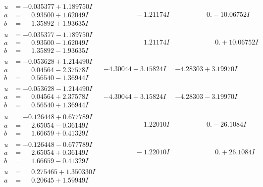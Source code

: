\documentclass[1p]{elsarticle_modified}
\theoremstyle{definition}
\begin{document}
$$\begin{array}{c|c|c}
\begin{aligned}
u &= -0.035377 + 1.189750 I \\
a &= \phantom{-}0.93500 + 1.62049 I \\
b &= \phantom{-}1.35892 + 1.93635 I\end{aligned}
 & \phantom{-0.000000 } -1.21174 I & \phantom{-0.000000 } 0. - 10.06752 I \\ \hline\begin{aligned}
u &= -0.035377 - 1.189750 I \\
a &= \phantom{-}0.93500 - 1.62049 I \\
b &= \phantom{-}1.35892 - 1.93635 I\end{aligned}
 & \phantom{-0.000000 -}1.21174 I & \phantom{-0.000000 -}0. + 10.06752 I \\ \hline\begin{aligned}
u &= -0.053628 + 1.214490 I \\
a &= \phantom{-}0.04564 - 2.37578 I \\
b &= \phantom{-}0.56540 - 1.36944 I\end{aligned}
 & -4.30044 - 3.15824 I & -4.28303 + 3.19970 I \\ \hline\begin{aligned}
u &= -0.053628 - 1.214490 I \\
a &= \phantom{-}0.04564 + 2.37578 I \\
b &= \phantom{-}0.56540 + 1.36944 I\end{aligned}
 & -4.30044 + 3.15824 I & -4.28303 - 3.19970 I \\ \hline\begin{aligned}
u &= -0.126448 + 0.677789 I \\
a &= \phantom{-}2.65054 - 0.36149 I \\
b &= \phantom{-}1.66659 + 0.41329 I\end{aligned}
 & \phantom{-0.000000 -}1.22010 I & \phantom{-0.000000 } 0. - 26.1084 I \\ \hline\begin{aligned}
u &= -0.126448 - 0.677789 I \\
a &= \phantom{-}2.65054 + 0.36149 I \\
b &= \phantom{-}1.66659 - 0.41329 I\end{aligned}
 & \phantom{-0.000000 } -1.22010 I & \phantom{-0.000000 -}0. + 26.1084 I \\ \hline\begin{aligned}
u &= \phantom{-}0.275465 + 1.350330 I \\
a &= \phantom{-}0.20645 + 1.59949 I \\

\end{aligned}
\end{array}$$
\end{document}

